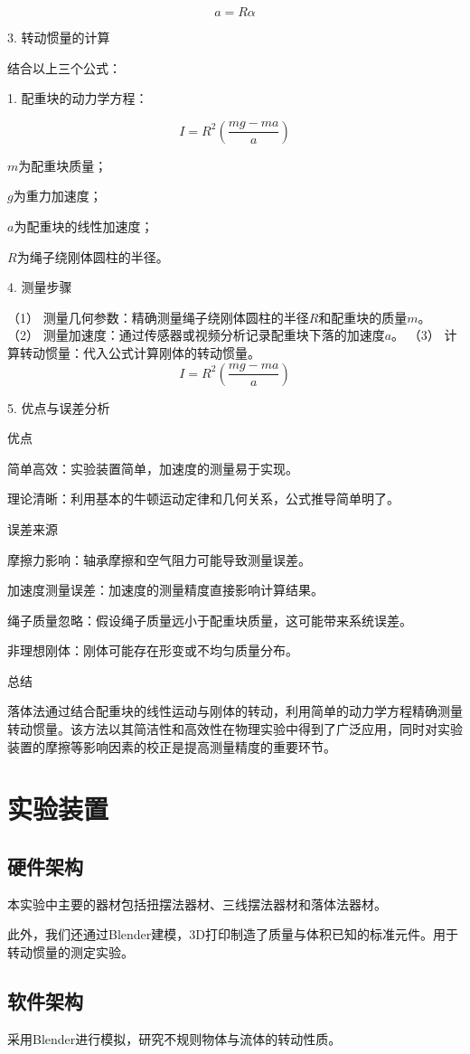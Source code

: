 \documentclass[12pt,hyperref,a4paper,UTF8]{ctexart}
\begin{document}
$$ a = R \alpha $$

3. 转动惯量的计算

结合以上三个公式：

1. 配重块的动力学方程：

$$ I = R^2 \left( \frac{m g - m a}{a} \right) $$

$m$为配重块质量；

$g$为重力加速度；

$a$为配重块的线性加速度；

$R$为绳子绕刚体圆柱的半径。


4. 测量步骤

（1） 测量几何参数：精确测量绳子绕刚体圆柱的半径$R$和配重块的质量$m$。
（2） 测量加速度：通过传感器或视频分析记录配重块下落的加速度$a$。
（3） 计算转动惯量：代入公式计算刚体的转动惯量。
$$ I=R^2(\frac{mg-ma}{a}) $$


5. 优点与误差分析

优点

简单高效：实验装置简单，加速度的测量易于实现。

理论清晰：利用基本的牛顿运动定律和几何关系，公式推导简单明了。


误差来源

摩擦力影响：轴承摩擦和空气阻力可能导致测量误差。

加速度测量误差：加速度的测量精度直接影响计算结果。

绳子质量忽略：假设绳子质量远小于配重块质量，这可能带来系统误差。

非理想刚体：刚体可能存在形变或不均匀质量分布。


总结

落体法通过结合配重块的线性运动与刚体的转动，利用简单的动力学方程精确测量转动惯量。该方法以其简洁性和高效性在物理实验中得到了广泛应用，同时对实验装置的摩擦等影响因素的校正是提高测量精度的重要环节。


\section{实验装置}
\subsection{硬件架构}
本实验中主要的器材包括扭摆法器材、三线摆法器材和落体法器材。

此外，我们还通过Blender建模，3D打印制造了质量与体积已知的标准元件。用于转动惯量的测定实验。

\subsection{软件架构}
采用Blender进行模拟，研究不规则物体与流体的转动性质。
\end{document}
